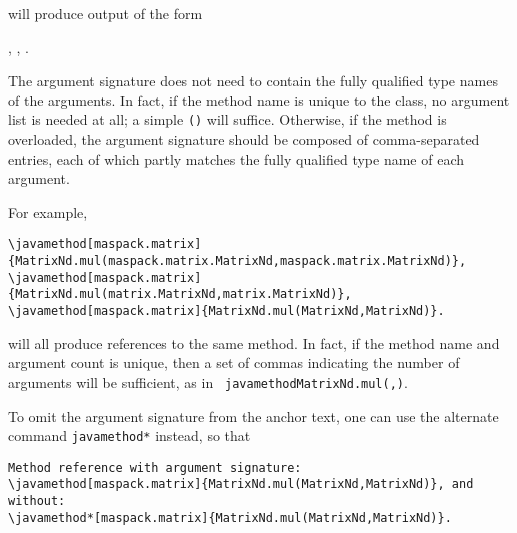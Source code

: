 \documentclass{article}
\begin{document}
will produce output of the form

\setjavabase{}
, 
,
.

%
%
%

The argument signature does not need to contain the fully qualified
type names of the arguments. In fact, if the method name is unique to
the class, no argument list is needed at all; a simple {\tt ()} will
suffice.  Otherwise, if the method is overloaded, the argument
signature should be composed of comma-separated entries, each of which
partly matches the fully qualified type name of each argument.

For example,

\begin{lstlisting}[]
\javamethod[maspack.matrix]{MatrixNd.mul(maspack.matrix.MatrixNd,maspack.matrix.MatrixNd)}, 
\javamethod[maspack.matrix]{MatrixNd.mul(matrix.MatrixNd,matrix.MatrixNd)},
\javamethod[maspack.matrix]{MatrixNd.mul(MatrixNd,MatrixNd)}.
\end{lstlisting}

will all produce references to the same method. In fact, if the method
name and argument count is unique, then a set of commas indicating the
number of arguments will be sufficient, as in {\tt
\BKS javamethod{MatrixNd.mul(,)}}.

To omit the argument signature from
the anchor text, one can use the alternate command {\tt \BKS javamethod*}
instead, so that

\begin{lstlisting}[]
Method reference with argument signature:
\javamethod[maspack.matrix]{MatrixNd.mul(MatrixNd,MatrixNd)}, and without:
\javamethod*[maspack.matrix]{MatrixNd.mul(MatrixNd,MatrixNd)}.
\end{lstlisting}
\end{document}

